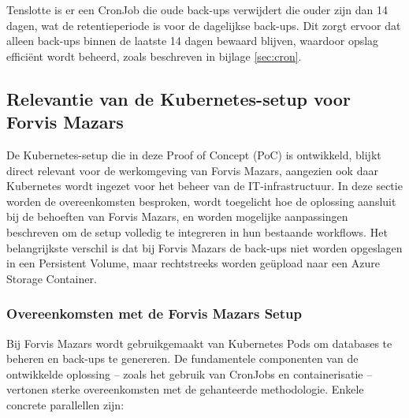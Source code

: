 Tenslotte is er een CronJob die oude back-ups verwijdert die ouder zijn dan 14 dagen, wat de retentieperiode is voor de dagelijkse back-ups. Dit zorgt ervoor dat alleen back-ups binnen de laatste 14 dagen bewaard blijven, waardoor opslag efficiënt wordt beheerd, zoals beschreven in bijlage \ref{sec:cron}.
\subsection{Relevantie van de Kubernetes-setup voor Forvis Mazars}

De Kubernetes-setup die in deze Proof of Concept (PoC) is ontwikkeld, blijkt direct relevant voor de werkomgeving van Forvis Mazars, aangezien ook daar Kubernetes wordt ingezet voor het beheer van de IT-infrastructuur. In deze sectie worden de overeenkomsten besproken, wordt toegelicht hoe de oplossing aansluit bij de behoeften van Forvis Mazars, en worden mogelijke aanpassingen beschreven om de setup volledig te integreren in hun bestaande workflows. Het belangrijkste verschil is dat bij Forvis Mazars de back-ups niet worden opgeslagen in een Persistent Volume, maar rechtstreeks worden geüpload naar een Azure Storage Container.

\subsubsection*{Overeenkomsten met de Forvis Mazars Setup}

Bij Forvis Mazars wordt gebruikgemaakt van Kubernetes Pods om databases te beheren en back-ups te genereren. De fundamentele componenten van de ontwikkelde oplossing – zoals het gebruik van CronJobs en containerisatie – vertonen sterke overeenkomsten met de gehanteerde methodologie. Enkele concrete parallellen zijn:

